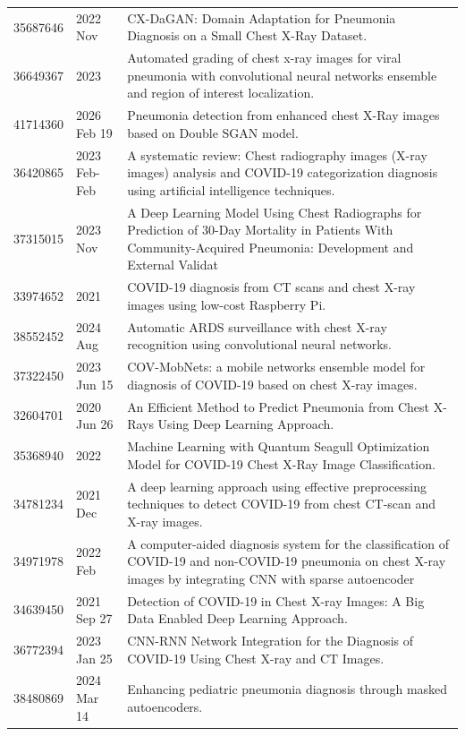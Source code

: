 \begin{longtable}{llp{9.5cm}}
35687646 & 2022 Nov & CX-DaGAN: Domain Adaptation for Pneumonia Diagnosis on a Small Chest X-Ray Dataset. \\
36649367 & 2023 & Automated grading of chest x-ray images for viral pneumonia with convolutional neural networks ensemble and region of interest localization. \\
41714360 & 2026 Feb 19 & Pneumonia detection from enhanced chest X-Ray images based on Double SGAN model. \\
36420865 & 2023 Feb-Feb & A systematic review: Chest radiography images (X-ray images) analysis and COVID-19 categorization diagnosis using artificial intelligence techniques. \\
37315015 & 2023 Nov & A Deep Learning Model Using Chest Radiographs for Prediction of 30-Day Mortality in Patients With Community-Acquired Pneumonia: Development and External Validat \\
33974652 & 2021 & COVID-19 diagnosis from CT scans and chest X-ray images using low-cost Raspberry Pi. \\
38552452 & 2024 Aug & Automatic ARDS surveillance with chest X-ray recognition using convolutional neural networks. \\
37322450 & 2023 Jun 15 & COV-MobNets: a mobile networks ensemble model for diagnosis of COVID-19 based on chest X-ray images. \\
32604701 & 2020 Jun 26 & An Efficient Method to Predict Pneumonia from Chest X-Rays Using Deep Learning Approach. \\
35368940 & 2022 & Machine Learning with Quantum Seagull Optimization Model for COVID-19 Chest X-Ray Image Classification. \\
34781234 & 2021 Dec & A deep learning approach using effective preprocessing techniques to detect COVID-19 from chest CT-scan and X-ray images. \\
34971978 & 2022 Feb & A computer-aided diagnosis system for the classification of COVID-19 and non-COVID-19 pneumonia on chest X-ray images by integrating CNN with sparse autoencoder \\
34639450 & 2021 Sep 27 & Detection of COVID-19 in Chest X-ray Images: A Big Data Enabled Deep Learning Approach. \\
36772394 & 2023 Jan 25 & CNN-RNN Network Integration for the Diagnosis of COVID-19 Using Chest X-ray and CT Images. \\
38480869 & 2024 Mar 14 & Enhancing pediatric pneumonia diagnosis through masked autoencoders. \\

\end{longtable}
